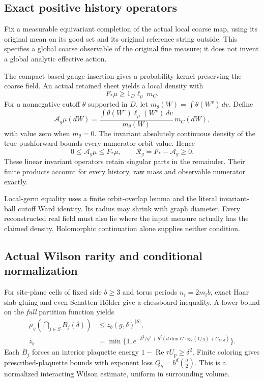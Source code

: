 \subsection{Exact positive history operators}

Fix a measurable equivariant completion of the actual local
coarse map, using its original mean on its good set and
its original reference string outside. This specifies a
global coarse observable of the original fine measure;
it does not invent a global analytic effective action.

The compact based-gauge insertion gives a probability
kernel preserving the coarse field. An actual retained
sheet yields a local density with
\[
                  F_*\mu\ge 1_D\ell_\mu\,m_C.
\]
For a nonnegative cutoff \(\theta\) supported in \(D\),
let \(m_\theta(W)=\int\theta(W^v)\,dv\). Define
\[
 \mathcal A_g\mu(dW)=
 \frac{\int\theta(W^v)\ell_\mu(W^v)\,dv}{m_\theta(W)}\,m_C(dW),
\]
with value zero when \(m_\theta=0\). The invariant
absolutely continuous density of the true pushforward
bounds every numerator orbit value. Hence
\[
       0\le\mathcal A_g\mu\le F_*\mu,\qquad
       \mathcal R_g=F_*-\mathcal A_g\ge0.
\]
These linear invariant operators retain singular parts
in the remainder. Their finite products account for
every history, raw mass and observable numerator exactly.

Local-germ equality uses a finite orbit-overlap lemma
and the literal invariant-ball cutoff Ward identity.
Its radius may shrink with graph diameter. Every
reconstructed real field must also lie where the input
measure actually has the claimed density.
Holomorphic continuation alone supplies neither condition.

\subsection{Actual Wilson rarity and conditional normalization}

For site-plane cells of fixed side \(b\ge3\) and torus
periods \(n_i=2m_i b\), exact Haar slab gluing and even
Schatten H\"older give a chessboard inequality.
A lower bound on the \emph{full} partition function yields
\begin{align*}
 \mu_g\left(\bigcap_{j\in S}B_j(\delta)\right)
 &\le z_b(g,\delta)^{|S|},\\
 z_b&=\min\{1,e^{-\delta^2/g^2+
       b^d(d\dim G\log(1/g)+C_{G,d})}\}.
\end{align*}
Each \(B_j\) forces an interior plaquette energy
\(1-\operatorname{Re}\tau U_p\ge\delta^2\).
Finite coloring gives prescribed-plaquette bounds with
exponent loss \(Q_b=b^d\binom d2\).
This is a normalized interacting Wilson estimate,
uniform in surrounding volume.

